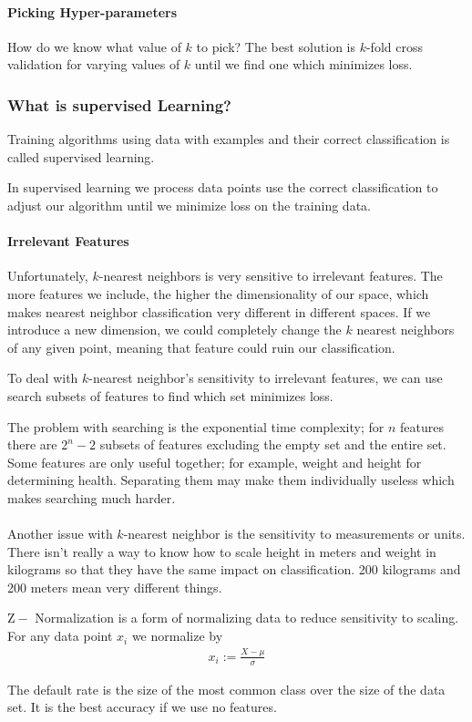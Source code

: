 \documentclass{chezarticle}
\begin{document}
\paragraph{Picking Hyper-parameters}
How do we know what value of $k$ to pick? The best solution is $k$-fold cross validation for varying values of $k$ until we find one which minimizes loss. 

\subsubsection{What is supervised Learning?}
\begin{definition}
Training algorithms using data with examples and their correct classification is called supervised learning.
\end{definition}
In supervised learning we process data points use the correct classification to adjust our algorithm until we minimize loss on the training data. 
\paragraph{Irrelevant Features}
Unfortunately, $k$-nearest neighbors is very sensitive to irrelevant features. The more features we include, the higher the dimensionality of our space, which makes nearest neighbor classification very different in different spaces. If we introduce a new dimension, we could completely change the $k$ nearest neighbors of any given point, meaning that feature could ruin our classification.
\begin{proposition}
To deal with $k$-nearest neighbor's sensitivity to irrelevant features, we can use search subsets of features to find which set minimizes loss.
\end{proposition}
The problem with searching is the exponential time complexity; for $n$ features there are $2^n - 2$ subsets of features excluding the empty set and the entire set. Some features are only useful together; for example, weight and height for determining health. Separating them may make them individually useless which makes searching much harder. 
\\
\\
Another issue with $k$-nearest neighbor is the sensitivity to measurements or units. There isn't really a way to know how to scale height in meters and weight in kilograms so that they have the same impact on classification. 200 kilograms and 200 meters mean very different things.
\begin{definition}
$\mathrm{Z}-$ Normalization is a form of normalizing data to reduce sensitivity to scaling. For any data point $x_i$ we normalize by
\begin{align*}
    x_i := \frac{X - \mu}{\sigma}
\end{align*}
\end{definition}
\begin{definition}
The default rate is the size of the most common class over the size of the data set. It is the best accuracy if we use no features.
\end{definition}
\end{document}
